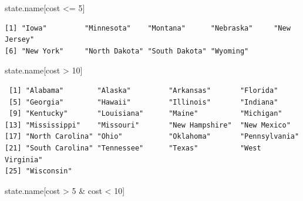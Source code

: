 \documentclass[
  letterpaper,
  DIV=11,
  numbers=noendperiod]{scrreprt}
\newenvironment{Shaded}{\begin{snugshade}}{\end{snugshade}}
\newcommand{\DecValTok}[1]{\textcolor[rgb]{0.68,0.00,0.00}{#1}}
\newcommand{\NormalTok}[1]{\textcolor[rgb]{0.00,0.23,0.31}{#1}}
\newcommand{\SpecialCharTok}[1]{\textcolor[rgb]{0.37,0.37,0.37}{#1}}
\begin{document}
\begin{tcolorbox}[enhanced jigsaw, colbacktitle=quarto-callout-tip-color!10!white, opacitybacktitle=0.6, breakable, left=2mm, leftrule=.75mm, toprule=.15mm, toptitle=1mm, bottomtitle=1mm, colframe=quarto-callout-tip-color-frame, opacityback=0, coltitle=black, arc=.35mm, titlerule=0mm, colback=white, bottomrule=.15mm, title=\textcolor{quarto-callout-tip-color}{\faLightbulb}\hspace{0.5em}{Answer}, rightrule=.15mm]

\begin{Shaded}
\begin{Highlighting}[]
\NormalTok{state.name[cost }\SpecialCharTok{\textless{}=} \DecValTok{5}\NormalTok{]}
\end{Highlighting}
\end{Shaded}

\begin{verbatim}
[1] "Iowa"         "Minnesota"    "Montana"      "Nebraska"     "New Jersey"  
[6] "New York"     "North Dakota" "South Dakota" "Wyoming"     
\end{verbatim}

\begin{Shaded}
\begin{Highlighting}[]
\NormalTok{state.name[cost }\SpecialCharTok{\textgreater{}} \DecValTok{10}\NormalTok{]}
\end{Highlighting}
\end{Shaded}

\begin{verbatim}
 [1] "Alabama"        "Alaska"         "Arkansas"       "Florida"       
 [5] "Georgia"        "Hawaii"         "Illinois"       "Indiana"       
 [9] "Kentucky"       "Louisiana"      "Maine"          "Michigan"      
[13] "Mississippi"    "Missouri"       "New Hampshire"  "New Mexico"    
[17] "North Carolina" "Ohio"           "Oklahoma"       "Pennsylvania"  
[21] "South Carolina" "Tennessee"      "Texas"          "West Virginia" 
[25] "Wisconsin"     
\end{verbatim}

\begin{Shaded}
\begin{Highlighting}[]
\NormalTok{state.name[cost }\SpecialCharTok{\textgreater{}} \DecValTok{5} \SpecialCharTok{\&}\NormalTok{ cost }\SpecialCharTok{\textless{}} \DecValTok{10}\NormalTok{]}
\end{Highlighting}
\end{Shaded}


\end{tcolorbox}
\end{document}
